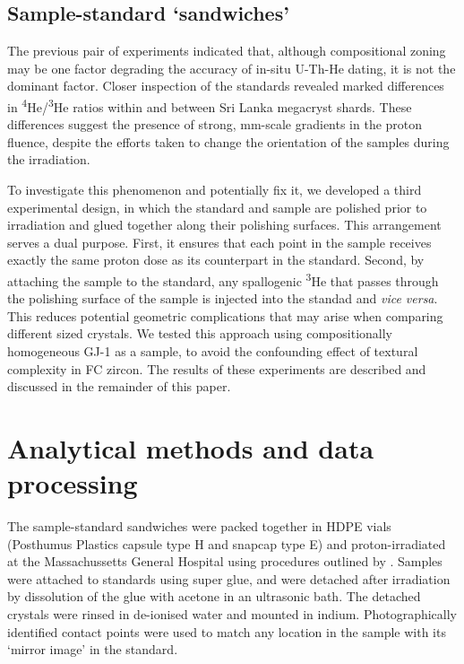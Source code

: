 \documentclass{article}
\begin{document}
\subsection{Sample-standard `sandwiches'}\label{sec:sandwich}

The previous pair of experiments indicated that, although
compositional zoning may be one factor degrading the accuracy of in-situ
U-Th-He dating, it is not the dominant factor. Closer inspection of
the standards revealed marked differences in
\textsuperscript{4}He/\textsuperscript{3}He ratios within and between
Sri Lanka megacryst shards. These differences suggest the presence of
strong, mm-scale gradients in the proton fluence, despite the efforts
taken to change the orientation of the samples during the
irradiation.\medskip

To investigate this phenomenon and potentially fix it, we developed a
third experimental design, in which the standard and sample are
polished prior to irradiation and glued together along their polishing
surfaces. This arrangement serves a dual purpose. First, it ensures
that each point in the sample receives exactly the same proton dose as
its counterpart in the standard. Second, by attaching the sample to
the standard, any spallogenic \textsuperscript{3}He that passes
through the polishing surface of the sample is injected into the
standad and \emph{vice versa}. This reduces potential geometric
complications that may arise when comparing different sized
crystals. We tested this approach using compositionally homogeneous
GJ-1 \citep{jackson2004} as a sample, to avoid the confounding effect
of textural complexity in FC zircon. The results of these experiments
are described and discussed in the remainder of this paper.

\section{Analytical methods and data processing}
\label{sec:methods}

The sample-standard sandwiches were packed together in HDPE vials
(Posthumus Plastics capsule type H and snapcap type E) and
proton-irradiated at the Massachussetts General Hospital using
procedures outlined by \citet{shuster2004}. Samples were attached to
standards using super glue, and were detached after irradiation by
dissolution of the glue with acetone in an ultrasonic bath. The
detached crystals were rinsed in de-ionised water and mounted in
indium. Photographically identified contact points were used to match
any location in the sample with its `mirror image' in the
standard.\medskip
\end{document}
